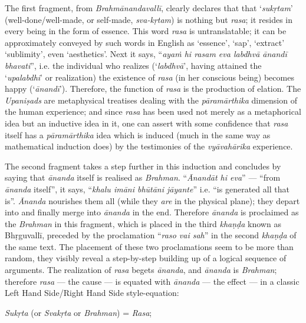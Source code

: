 The first fragment, from \textsl{Brahmānandavallī},
 clearly declares that that ‘\textsl{sukṛtam}’ (well-done/well-made, or self-made, \textsl{sva-kṛtam}) is nothing but \textsl{rasa}; it resides in every being in the form of essence. This word \textsl{rasa} is untranslatable; it can be approximately conveyed by such words in English as ‘essence’, ‘sap’, ‘extract’ ‘sublimity’, even ‘aesthetics’. Next it says, “\textsl{ayaṁ hi rasam eva labdhvā ānandī bhavati}”, i.e. the individual who realizes (‘\textsl{labdhvā}’, having attained the ‘\textsl{upalabdhi}’ or realization) the existence of \textsl{rasa} (in her conscious being) becomes happy (‘\textsl{ānandī}’). Therefore, the function of \textsl{rasa} is the production of elation. The \textsl{Upaniṣads} are metaphysical treatises dealing with the \textsl{pāramārthika} dimension of the human experience; and since \textsl{rasa} has been used not merely as a metaphorical idea but an inductive idea in it, one can assert with some confidence that \textsl{rasa} itself has a \textsl{pāramārthika} idea which is induced (much in the same way as mathematical induction does) by the testimonies of the \textsl{vyāvahārika} experience.

The second fragment takes a step further in this induction and concludes by saying that \textsl{ānanda} itself is realised as \textsl{Brahman}. “\textsl{Ānandāt hi eva}” --- “from \textsl{ānanda} itself”, it says, “\textsl{khalu imāni bhūtāni jāyante}” i.e. “is generated all that is”. \textsl{Ānanda} nourishes them all (while they \textsl{are} in the physical plane); they depart into and finally merge into \textsl{ānanda} in the end. Therefore \textsl{ānanda} is proclaimed as the \textsl{Brahman} in this fragment, which is placed in the third \textsl{khaṇḍa} known as Bhṛguvallī, preceded by the proclamation “\textsl{raso vai sah}” in the second \textsl{khaṇḍa} of the same text. The placement of these two proclamations seem to be more than random, they visibly reveal a step-by-step building up of a logical sequence of arguments. The realization of \textsl{rasa} begets \textsl{ānanda}, and \textsl{ānanda} is \textsl{Brahman}; therefore \textsl{rasa} --- the cause --- is equated with \textsl{ānanda} --- the effect --- in a classic Left Hand Side/Right Hand Side style-equation: 

\textsl{Sukṛta} (or \textsl{Svakṛta} or \textsl{Brahman}) = \textsl{Rasa};

